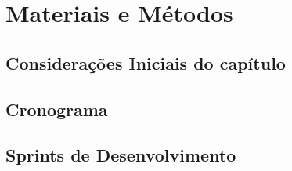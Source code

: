 \chapter{Materiais e Métodos}

\section{Considerações Iniciais do capítulo}
\section{Cronograma}
\section{Sprints de Desenvolvimento}